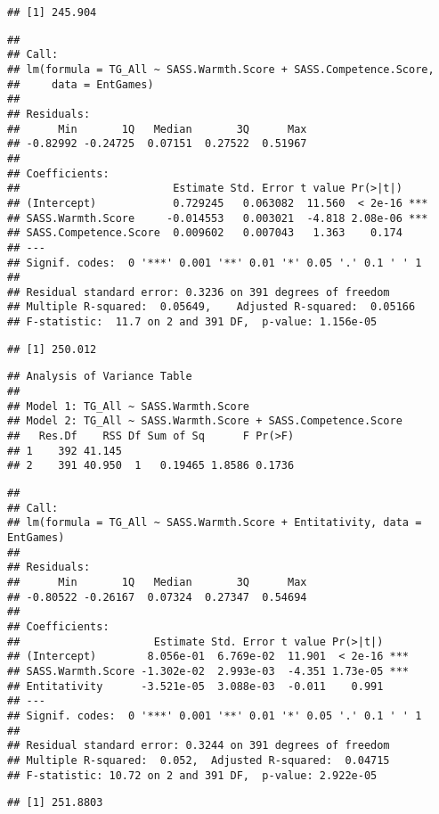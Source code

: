 \documentclass[
  doc,draftall]{apa6}
\begin{document}
\begin{verbatim}
## [1] 245.904
\end{verbatim}

\begin{verbatim}
## 
## Call:
## lm(formula = TG_All ~ SASS.Warmth.Score + SASS.Competence.Score, 
##     data = EntGames)
## 
## Residuals:
##      Min       1Q   Median       3Q      Max 
## -0.82992 -0.24725  0.07151  0.27522  0.51967 
## 
## Coefficients:
##                        Estimate Std. Error t value Pr(>|t|)    
## (Intercept)            0.729245   0.063082  11.560  < 2e-16 ***
## SASS.Warmth.Score     -0.014553   0.003021  -4.818 2.08e-06 ***
## SASS.Competence.Score  0.009602   0.007043   1.363    0.174    
## ---
## Signif. codes:  0 '***' 0.001 '**' 0.01 '*' 0.05 '.' 0.1 ' ' 1
## 
## Residual standard error: 0.3236 on 391 degrees of freedom
## Multiple R-squared:  0.05649,    Adjusted R-squared:  0.05166 
## F-statistic:  11.7 on 2 and 391 DF,  p-value: 1.156e-05
\end{verbatim}

\begin{verbatim}
## [1] 250.012
\end{verbatim}

\begin{verbatim}
## Analysis of Variance Table
## 
## Model 1: TG_All ~ SASS.Warmth.Score
## Model 2: TG_All ~ SASS.Warmth.Score + SASS.Competence.Score
##   Res.Df    RSS Df Sum of Sq      F Pr(>F)
## 1    392 41.145                           
## 2    391 40.950  1   0.19465 1.8586 0.1736
\end{verbatim}

\begin{verbatim}
## 
## Call:
## lm(formula = TG_All ~ SASS.Warmth.Score + Entitativity, data = EntGames)
## 
## Residuals:
##      Min       1Q   Median       3Q      Max 
## -0.80522 -0.26167  0.07324  0.27347  0.54694 
## 
## Coefficients:
##                     Estimate Std. Error t value Pr(>|t|)    
## (Intercept)        8.056e-01  6.769e-02  11.901  < 2e-16 ***
## SASS.Warmth.Score -1.302e-02  2.993e-03  -4.351 1.73e-05 ***
## Entitativity      -3.521e-05  3.088e-03  -0.011    0.991    
## ---
## Signif. codes:  0 '***' 0.001 '**' 0.01 '*' 0.05 '.' 0.1 ' ' 1
## 
## Residual standard error: 0.3244 on 391 degrees of freedom
## Multiple R-squared:  0.052,  Adjusted R-squared:  0.04715 
## F-statistic: 10.72 on 2 and 391 DF,  p-value: 2.922e-05
\end{verbatim}

\begin{verbatim}
## [1] 251.8803
\end{verbatim}
\end{document}
